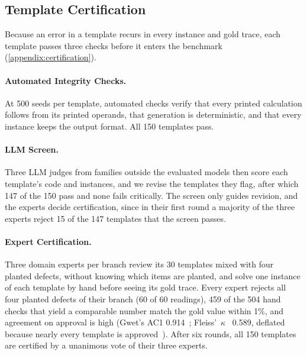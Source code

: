 \subsection{Template Certification}
\label{subsec:certification}

Because an error in a template recurs in every instance and gold trace, each template passes three
checks before it enters the benchmark (\autoref{appendix:certification}).

\paragraph{Automated Integrity Checks.}
At 500 seeds per template, automated checks verify that every printed calculation follows from its
printed operands, that generation is deterministic, and that every instance keeps the output format.
All 150 templates pass.

\paragraph{LLM Screen.}
Three LLM judges from families outside the evaluated models then score each template's code and
instances, and we revise the templates they flag, after which 147 of the 150 pass and none fails
critically.
The screen only guides revision, and the experts decide certification, since in their first round a
majority of the three experts reject 15 of the 147 templates that the screen passes.

\paragraph{Expert Certification.}
Three domain experts per branch review its 30 templates mixed with four planted defects, without
knowing which items are planted, and solve one instance of each template by hand before seeing its
gold trace.
Every expert rejects all four planted defects of their branch (60 of 60 readings), 459 of the 504
hand checks that yield a comparable number match the gold value within 1\%, and agreement on
approval is high (Gwet's AC1 0.914~\citep{gwet2008}; Fleiss'~$\kappa$~\citep{fleiss1971} 0.589,
deflated because nearly every template is approved~\citep{feinstein1990high}).
After six rounds, all 150 templates are certified by a unanimous vote of their three experts.
